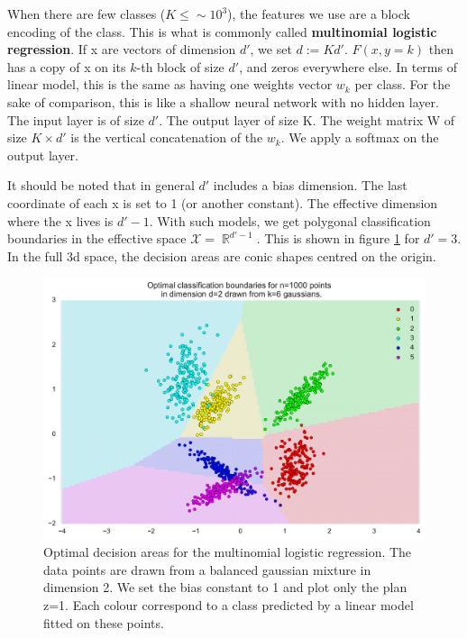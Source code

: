 \documentclass{article}
\DeclareMathOperator{\R}{\mathbb{R}}
\DeclareMathOperator{\1}{\mathbb{1}}
\begin{document}
When there are few classes ($K \leq \sim 10^3$), the features we use are a block encoding of the class.
This is what is commonly called \textbf{multinomial logistic regression}.
If x are vectors of dimension $d'$, we set $d:=Kd'$. $F(x, y=k)$ then has a copy of x on its $k$-th block of size $d'$, and zeros everywhere else.
In terms of linear model, this is the same as having one weights vector $w_k$ per class.
For the sake of comparison, this is like a shallow neural network with no hidden layer.
The input layer is of size $d'$.
The output layer of size K.
The weight matrix W of size $K \times d'$ is the vertical concatenation of the $w_k$.
We apply a softmax on the output layer.

It should be noted that in general $d'$ includes a bias dimension.
The last coordinate of each x is set to 1 (or another constant).
The effective dimension where the x lives is $d'-1$.
With such models, we get polygonal classification boundaries in the effective space $\mathcal X = \R^{d'-1}$.
This is shown in figure \ref{linear classification} for $d'=3$.
In the full 3d space, the decision areas are conic shapes centred on the origin.

\begin{figure}[ht]
	\label{linear classification}
	\includegraphics[width=\textwidth]{images/linear_classification.pdf}
	\caption{
	Optimal decision areas for the multinomial logistic regression.
	The data points are drawn from a balanced gaussian mixture in dimension 2.
	We set the bias constant to 1 and plot only the plan z=1.
	Each colour correspond to a class predicted by a linear model fitted on these points. 
	}
\end{figure}
\end{document}
